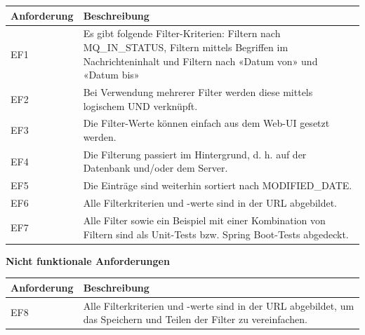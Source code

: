 \noindent \begin{tabular}{|p{3cm}|p{12cm}|}
	\hline
	\textbf{Anforderung}  & \textbf{Beschreibung} \\ \hline
	EF1    & Es gibt folgende Filter-Kriterien: Filtern nach MQ\_IN\_STATUS, Filtern mittels Begriffen im Nachrichteninhalt und Filtern nach «Datum von» und «Datum bis»     \\ \hline
	EF2    & Bei Verwendung mehrerer Filter werden diese mittels logischem UND verknüpft.     \\ \hline
	EF3    & Die Filter-Werte können einfach aus dem Web-UI gesetzt werden.     \\ \hline
	EF4    & Die Filterung passiert im Hintergrund, d. h. auf der Datenbank und/oder dem Server.     \\ \hline
	EF5    & Die Einträge sind weiterhin sortiert nach MODIFIED\_DATE.     \\ \hline
	EF6    & Alle Filterkriterien und -werte sind in der URL abgebildet.     \\ \hline
	EF7    & Alle Filter sowie ein Beispiel mit einer Kombination von Filtern sind als Unit-Tests bzw. Spring Boot-Tests abgedeckt.     \\ \hline
\end{tabular}\newline

\newpage
\noindent \textbf{Nicht funktionale Anforderungen}\newline

\noindent \begin{tabular}{|p{3cm}|p{12cm}|}
	\hline
	\textbf{Anforderung}  & \textbf{Beschreibung} \\ \hline
	EF8    & Alle Filterkriterien und -werte sind in der URL abgebildet, um das Speichern und Teilen der Filter zu vereinfachen.     \\ \hline
\end{tabular}

\newpage